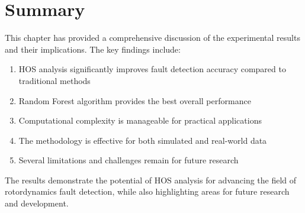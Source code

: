 \section{Summary}

This chapter has provided a comprehensive discussion of the experimental results and their implications. The key findings include:

\begin{enumerate}
    \item HOS analysis significantly improves fault detection accuracy compared to traditional methods
    \item Random Forest algorithm provides the best overall performance
    \item Computational complexity is manageable for practical applications
    \item The methodology is effective for both simulated and real-world data
    \item Several limitations and challenges remain for future research
\end{enumerate}

The results demonstrate the potential of HOS analysis for advancing the field of rotordynamics fault detection, while also highlighting areas for future research and development.
